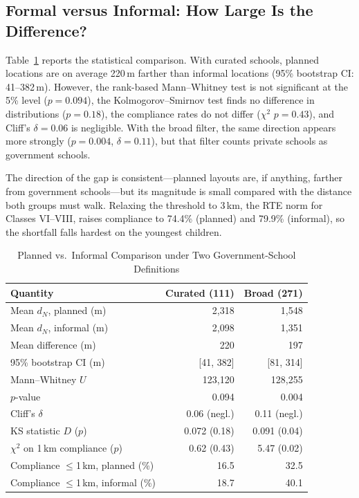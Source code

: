 \documentclass[conference]{IEEEtran}
\newcommand{\km}{\,km}
\newcommand{\m}{\,m}
\begin{document}
\subsection{Formal versus Informal: How Large Is the Difference?}
Table~\ref{tab:tests} reports the statistical comparison. With curated schools, planned locations are on average 220\m{} farther than informal locations (95\% bootstrap CI: 41--382\m{}). However, the rank-based Mann--Whitney test is not significant at the 5\% level ($p=0.094$), the Kolmogorov--Smirnov test finds no difference in distributions ($p=0.18$), the compliance rates do not differ ($\chi^2$ $p=0.43$), and Cliff's $\delta=0.06$ is negligible. With the broad filter, the same direction appears more strongly ($p=0.004$, $\delta=0.11$), but that filter counts private schools as government schools.

The direction of the gap is consistent---planned layouts are, if anything, farther from government schools---but its magnitude is small compared with the distance both groups must walk. Relaxing the threshold to 3\km{}, the RTE norm for Classes VI--VIII, raises compliance to 74.4\% (planned) and 79.9\% (informal), so the shortfall falls hardest on the youngest children.

\begin{table}[!t]
\centering
\caption{Planned vs.\ Informal Comparison under Two Government-School Definitions}
\label{tab:tests}
\footnotesize
\begin{tabular}{@{}lrr@{}}
\toprule
\textbf{Quantity} & \textbf{Curated (111)} & \textbf{Broad (271)} \\
\midrule
Mean $d_N$, planned (m) & 2,318 & 1,548 \\
Mean $d_N$, informal (m) & 2,098 & 1,351 \\
Mean difference (m) & 220 & 197 \\
95\% bootstrap CI (m) & [41, 382] & [81, 314] \\
Mann--Whitney $U$ & 123,120 & 128,255 \\
\quad $p$-value & 0.094 & 0.004 \\
Cliff's $\delta$ & 0.06 (negl.) & 0.11 (negl.) \\
KS statistic $D$ ($p$) & 0.072 (0.18) & 0.091 (0.04) \\
$\chi^2$ on 1\km{} compliance ($p$) & 0.62 (0.43) & 5.47 (0.02) \\
Compliance $\le$1\km{}, planned (\%) & 16.5 & 32.5 \\
Compliance $\le$1\km{}, informal (\%) & 18.7 & 40.1 \\
\bottomrule
\end{tabular}
\end{table}
\end{document}
